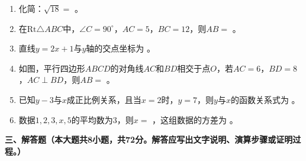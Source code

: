 \documentclass[12pt, a4paper]{ctexart}
\begin{document}
\begin{enumerate}[label=\arabic*., start=11]

\item 化简：$\sqrt{18}=$ \underline{\hspace{3cm}} 。

\item 在$\mathrm{Rt}\triangle ABC$中，$\angle C=90^{\circ}$，$AC=5$，$BC=12$，则$AB=$ \underline{\hspace{3cm}} 。

\item 直线$y=2x+1$与$y$轴的交点坐标为 \underline{\hspace{3cm}} 。

\item 如图，平行四边形$ABCD$的对角线$AC$和$BD$相交于点$O$，若$AC=6$，$BD=8$，$AC\perp BD$，则$AB=$ \underline{\hspace{3cm}} 。

\item 已知$y-3$与$x$成正比例关系，且当$x=2$时，$y=7$，则$y$与$x$的函数关系式为 \underline{\hspace{3cm}} 。

\item 数据$1,2,3,x,5$的平均数为$3$，则$x=$ \underline{\hspace{3cm}} ，这组数据的方差为 \underline{\hspace{3cm}} 。

\end{enumerate}

\vspace{0.5cm}

{\large\bfseries 三、解答题（本大题共8小题，共72分。解答应写出文字说明、演算步骤或证明过程。）}
\end{document}
